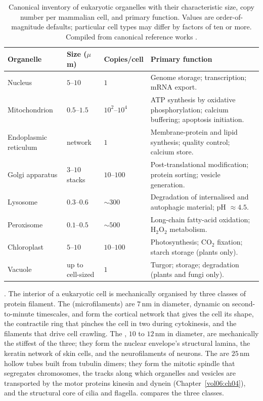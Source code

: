\begin{table}[htbp]
\centering
\caption[Canonical organelle inventory]{Canonical inventory of
eukaryotic organelles with their characteristic size, copy number per
mammalian cell, and primary function. Values are order-of-magnitude
defaults; particular cell types may differ by factors of ten or more.
Compiled from canonical reference works
\cite{text:v6c01-alberts-mbc-2022,text:v6c01-bionumbers-2015}.}
\label{tab:vol06:ch01:organelles}
\begin{tabular}{p{2.7cm} p{2.0cm} p{1.6cm} p{6.5cm}}
\hline
\textbf{Organelle} & \textbf{Size ($\mu$m)} &
\textbf{Copies/cell} & \textbf{Primary function} \\
\hline
Nucleus & $5$--$10$ & $1$ &
  Genome storage; transcription; mRNA export. \\
Mitochondrion & $0.5$--$1.5$ & $10^2$--$10^4$ &
  ATP synthesis by oxidative phosphorylation; calcium buffering;
  apoptosis initiation. \\
Endoplasmic reticulum & network & $1$ &
  Membrane-protein and lipid synthesis; quality control;
  calcium store. \\
Golgi apparatus & $3$--$10$ stacks & $10$--$100$ &
  Post-translational modification; protein sorting; vesicle
  generation. \\
Lysosome & $0.3$--$0.6$ & $\sim 300$ &
  Degradation of internalised and autophagic material; pH $\approx 4.5$. \\
Peroxisome & $0.1$--$0.5$ & $\sim 500$ &
  Long-chain fatty-acid oxidation; H$_2$O$_2$ metabolism. \\
Chloroplast & $5$--$10$ & $10$--$100$ &
  Photosynthesis; CO$_2$ fixation; starch storage (plants only). \\
Vacuole & up to cell-sized & $1$ &
  Turgor; storage; degradation (plants and fungi only). \\
\hline
\end{tabular}
\end{table}

. The interior of a eukaryotic cell is
mechanically organised by three classes of protein filament. The
 (microfilaments) are $7\,\si{\nano\meter}$
in diameter, dynamic on second-to-minute timescales, and form the
cortical network that gives the cell its shape, the contractile ring
that pinches the cell in two during cytokinesis, and the filaments
that drive cell crawling. The , $10$
to $12\,\si{\nano\meter}$ in diameter, are mechanically the stiffest
of the three; they form the nuclear envelope's structural lamina, the
keratin network of skin cells, and the neurofilaments of neurons.
The  are $25\,\si{\nano\meter}$ hollow tubes
built from tubulin dimers; they form the mitotic spindle that
segregates chromosomes, the tracks along which organelles and vesicles
are transported by the motor proteins kinesin and dynein (Chapter~\ref{vol06:ch04}),
and the structural core of cilia and flagella.
 compares the three classes.

